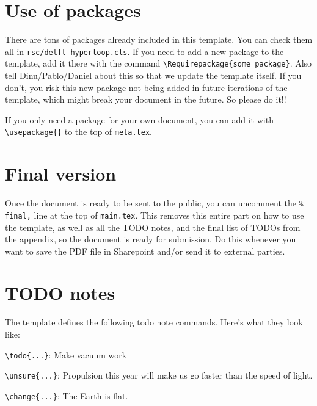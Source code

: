 \section*{Use of packages}

There are tons of packages already included in this template. You can check them all in \verb|rsc/delft-hyperloop.cls|. If you need to add a new package to the template, add it there with the command \verb|\Requirepackage{some_package}|. Also tell Dinu/Pablo/Daniel about this so that we update the template itself. If you don't, you risk this new package not being added in future iterations of the template, which might break your document in the future. So please do it!!

If you only need a package for your own document, you can add it with \verb|\usepackage{}| to the top of \verb|meta.tex|.

\section*{Final version}

Once the document is ready to be sent to the public, you can uncomment the \verb|% final,| line at the top of \verb|main.tex|. This removes this entire part on how to use the template, as well as all the TODO notes, and the final list of TODOs from the appendix, so the document is ready for submission. Do this whenever you want to save the PDF file in Sharepoint and/or send it to external parties.


\section*{TODO notes}

The template defines the following todo note commands. Here's what they look like:

\vspace{5em}

\verb|\todo{...}|: Make vacuum work 

\vspace{5em}

\verb|\unsure{...}|: Propulsion this year will make us go faster than the speed of light. 

\vspace{5em}

\verb|\change{...}|: The Earth is flat. 

